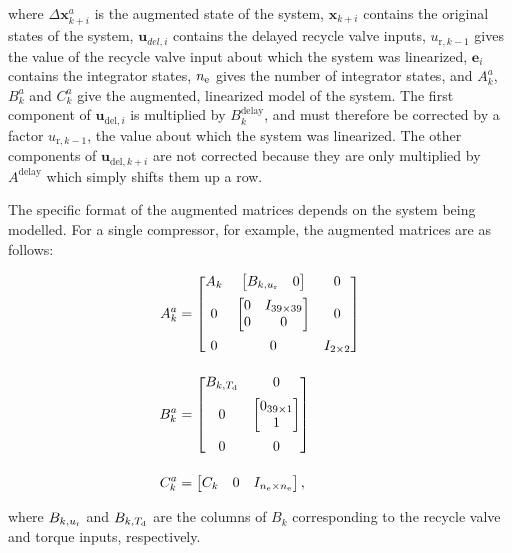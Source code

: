 \noindent where $\Delta \bm{x}_{k+i}^a$ is the augmented state of the system, 
$\bm{x}_{k+i}$ contains the original states of the system, 
$\bm{u}_{del,i}$ contains the delayed recycle valve inputs,
$u_{\text{r},k-1}$ gives the value of the recycle valve input about which the system was linearized,
$\bm{e}_i$ contains the integrator states,
$n_\text{e}$ gives the number of integrator states,
and $A_k^a$, $B_k^a$ and $C_k^a$ give the augmented, linearized model of the system.
The first component of $\bm{u}_{\text{del},i}$  is multiplied by $B_k^\text{delay}$, and must therefore be corrected by a factor $u_{\text{r},k-1}$, the value about which the system was linearized. 
The other components of $\bm{u}_{\text{del},k+i}$ are not corrected because they are only multiplied by $A^\text{delay}$ which simply shifts them up a row.

The specific format of the augmented matrices depends on the system being modelled. For a single compressor, for example, the augmented matrices are as follows:

\begin{equation}
  \begin{split}
    A_k^a & =
    \begin{bmatrix}
      A_k & \begin{bmatrix} B_{k,u\ut{r}} & 0 \end{bmatrix} & 0\matskip{0.5em}
      0 & \begin{bmatrix} 0 & I_{39\times 39}\\ 0 & 0\end{bmatrix} & 0\matskip{0.5em}
      0 & 0 & I_{2\times 2}
    \end{bmatrix}\\[1em]
    B_k^a & = 
    \begin{bmatrix}
      B_{k,T\ut{d}} & 0\matskip{0.5em}
      0 & \begin{bmatrix} 0_{39\times 1}\\ 1 \end{bmatrix} \matskip{0.5em}
      0 & 0
    \end{bmatrix}\\[1em]
    C_k^a & = \begin{bmatrix}
      C_k & 0 & I_{n\ut{e} \times n\ut{e}}
    \end{bmatrix},
  \end{split}
\end{equation}

where $B_{k,u_\text{r}}$ and $B_{k,T_\text{d}}$ are the columns of $B_k$ corresponding to the recycle valve and torque inputs, respectively.

